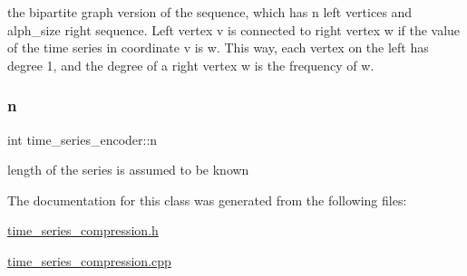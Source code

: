the bipartite graph version of the sequence, which has n left vertices and alph\+\_\+size right sequence. Left vertex v is connected to right vertex w if the value of the time series in coordinate v is w. This way, each vertex on the left has degree 1, and the degree of a right vertex w is the frequency of w. 

\mbox{\label{classtime__series__encoder_ab84b7528d50c495fc140f1eb50d9b539}} 
\subsubsection{\texorpdfstring{n}{n}}
{\footnotesize\ttfamily int time\+\_\+series\+\_\+encoder\+::n\hspace{0.3cm}{\ttfamily [private]}}



length of the series is assumed to be known 



The documentation for this class was generated from the following files\+:\begin{DoxyCompactItemize}
\item 
\hyperlink{time__series__compression_8h}{time\+\_\+series\+\_\+compression.\+h}\item 
\hyperlink{time__series__compression_8cpp}{time\+\_\+series\+\_\+compression.\+cpp}\end{DoxyCompactItemize}
